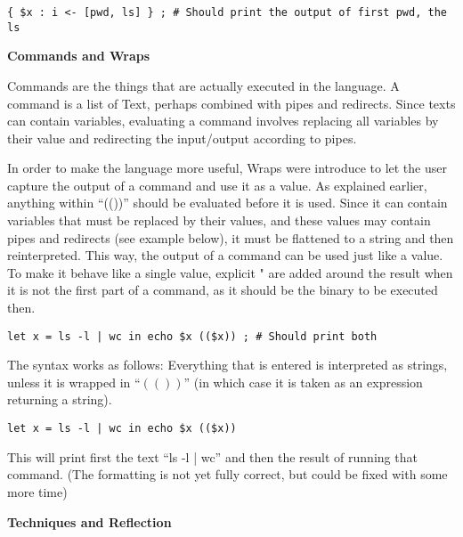 \documentclass[11pt,a4paper]{article}
\begin{document}
\begin{verbatim}
{ $x : i <- [pwd, ls] } ; # Should print the output of first pwd, the ls
\end{verbatim}

\textbf{Commands and Wraps}

Commands are the things that are actually executed in the language. A command
is a list of Text, perhaps combined with pipes and redirects. Since texts can
contain variables, evaluating a command involves replacing all variables by
their value and redirecting the input/output according to pipes.

In order to make the language more useful, Wraps were introduce to let the user
capture the output of a command and use it as a value. As explained earlier,
anything within ``(())'' should be evaluated before it is used. Since it can
contain variables that must be replaced by their values, and these values may
contain pipes and redirects (see example below), it must be flattened to a
string and then reinterpreted. This way, the output of a command can be used
just like a value. To make it behave like a single value, explicit " are added
around the result when it is not the first part of a command, as it should be
the binary to be executed then.

\begin{verbatim}
let x = ls -l | wc in echo $x (($x)) ; # Should print both
\end{verbatim}




The syntax works as follows: Everything that is entered is interpreted as
strings, unless it is wrapped in ``$\left( \left(  \right) \right)$'' (in which
case it is taken as an expression returning a string).

\begin{verbatim}
let x = ls -l | wc in echo $x (($x))
\end{verbatim}

This will print first the text ``ls -l | wc'' and then the result of running
that command. (The formatting is not yet fully correct, but could be fixed with
some more time)

\textbf{Techniques and Reflection}
\end{document}
